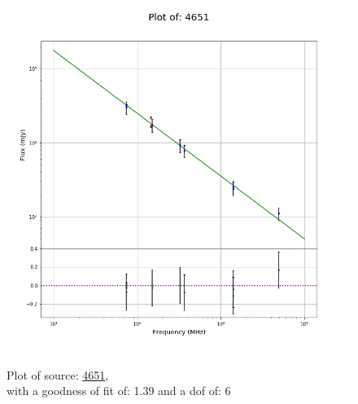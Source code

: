 \documentclass{article}
\begin{document}
\begin{figure}[H]
\begin{minipage}{0.5\textwidth}
        \includegraphics[scale = 0.35]{KmeulenSimSource_1hr/1hr4651.png}
        \captionsetup{labelformat=empty}
        \caption{Plot of source: \href{http://banana.transientskp.org/r4/vlo_KmeulenSimSource/runningcatalog/4651}{4651},\\with a goodness of fit of: 1.39 and a dof of: 6}
    \addtocounter{figure}{-1}
    \label{KmeulenSimSource:1hr:4651:plot}
    \end{minipage}
\end{figure}
\end{document}
